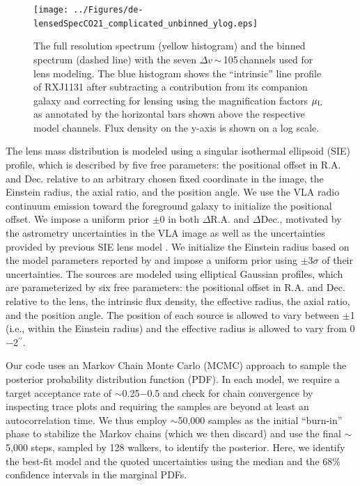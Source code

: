 \documentclass[]{emulateapj}
\begin{document}
\begin{figure}[!htbp]
\centering
\texttt{[image: ../Figures/de-lensedSpecCO21\_complicated\_unbinned\_ylog.eps]}
\caption{The full resolution \bco spectrum (yellow histogram) and 
the binned spectrum (dashed line) with the seven $\Delta v$\,$\sim$\,105\,\kms channels used for lens modeling. The 
blue histogram shows the ``intrinsic'' line profile of RXJ1131 
after subtracting a contribution from its companion galaxy and 
correcting for lensing using the magnification factors $\mu_{\rm L}$ as annotated by the horizontal bars shown
above the respective model channels. Flux density on the y-axis is shown on a log scale.
\label{fig:delensed}}
\end{figure}

The lens mass distribution is modeled using a singular isothermal
ellipsoid (SIE) profile, which is described by five free parameters: the
positional offset in R.A. and Dec. relative to an arbitrary chosen
fixed coordinate in the image, the Einstein radius, the axial ratio, and the
position angle. We use the VLA radio continuum emission toward
the foreground galaxy to initialize the positional offset. We impose a
uniform prior $\pm$0 in both $\Delta$R.A. and $\Delta$Dec.,
motivated by the astrometry uncertainties in the VLA image as well as
the uncertainties provided by previous SIE lens model .
We initialize the Einstein radius based on the model parameters reported by 
and impose a uniform prior using $\pm$3$\sigma$ of their uncertainties.
The sources are modeled using elliptical Gaussian profiles, which are
parameterized by six free parameters: the positional offset in R.A.
and Dec. relative to the lens, the intrinsic flux density, the effective
radius, the axial ratio, and the position angle. The position of each source
is allowed to vary between $\pm$1 (i.e., within the Einstein radius)
and the effective radius is allowed to vary from 0$-$2$^{\prime\prime}$.

Our code uses an Markov Chain Monte Carlo (MCMC) approach to sample the
posterior probability distribution function (PDF).
In each model, we require a target acceptance rate of $\sim$0.25$-$0.5
and check for chain convergence by inspecting trace plots
and requiring the samples are beyond at least an autocorrelation time.
We thus employ $\sim$50,000 samples as the initial ``burn-in'' phase
to stabilize the Markov chains (which we then discard) and
use the final $\sim$5,000 steps, sampled by 128 walkers, to identify
the posterior. Here, we
identify the best-fit model and the quoted uncertainties using the
median and the 68\% confidence intervals in the marginal PDFs.

\end{document}
